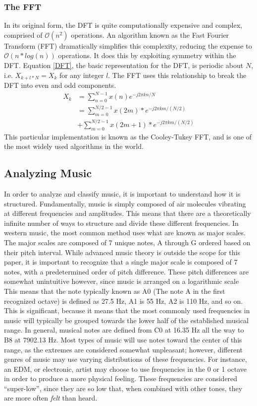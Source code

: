 \documentclass[conference]{IEEEtran}
\begin{document}
\subsubsection{The FFT}
In its original form, the DFT is quite computationally expensive and complex, comprised of $\mathcal{O}(n^{2})$ operations. An algorithm known as the Fast Fourier Transform (FFT) dramatically simplifies this complexity, reducing the expense to $\mathcal{O}(n*log(n))$ operations. It does this by exploiting symmetry within the DFT. Equation \eqref{DFT}, the basic representation for the DFT, is periodic about $N$, i.e. $X_{k+l*N}=X_{k}$ for any integer $l$. The FFT uses this relationship to break the DFT into even and odd components.
\begin{equation}\label{FFT}
  \begin{split}
 X_{k} & =\sum_{n=0}^{N-1}{x(n)e^{-j2\pi kn/N}}\\
  & =\sum_{m=0}^{N/2-1}{x(2m)*e^{-j2\pi km/(N/2)}}\\ & + \sum_{m=0}^{N/2-1}{x(2m+1)*e^{-j2\pi km/(N/2)}}
  \end{split}
\end{equation}
This particular implementation is known as the Cooley-Tukey FFT, and is one of the most widely used algorithms in the world. 
\subsection{Analyzing Music}
In order to analyze and classify music, it is important to understand how it is structured. Fundamentally, music is simply composed of air molecules vibrating at different frequencies and amplitudes. This means that there are a theoretically infinite number of ways to structure and divide these different frequencies. In western music, the most common method uses what are known as major scales. The major scales are composed of 7 unique notes, A through G ordered based on their pitch interval. While advanced music theory is outside the scope for this paper, it is important to recognize that a single major scale is composed of 7 notes, with a predetermined order of pitch difference. These pitch differences are somewhat unintuitive however, since music is arranged on a logarithmic scale This means that the note typically known as A0 (The note A in the first recognized octave) is defined as 27.5 Hz, A1 is 55 Hz, A2 is 110 Hz, and so on. This is significant, because it means that the most commonly used frequencies in music will typically be grouped towards the lower half of the established musical range. In general, musical notes are defined from C0 at 16.35 Hz all the way to B8 at 7902.13 Hz. Most types of music will use notes toward the center of this range, as the extremes are considered somewhat unpleasant; however, different genres of music may use varying distributions of these frequencies. For instance, an EDM, or electronic, artist may choose to use frequencies in the 0 or 1 octave in order to produce a more physical feeling. These frequencies are considered ``super-low'', since they are so low that, when combined with other tones, they are more often \textit{felt} than heard.
\end{document}
